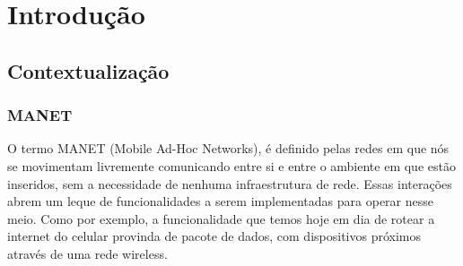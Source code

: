 \documentclass[12pt, %
openright, 
oneside,
a4paper,
brazil]{facom-ufu-abntex2}
\begin{document}


\tableofcontents*
\cleardoublepage





\textual



\chapter{Introdução}
\section{Contextualização}
\subsection{MANET}
O termo MANET (Mobile Ad-Hoc Networks), é definido pelas redes em que nós se movimentam livremente comunicando entre si e entre o ambiente em que estão inseridos, sem a necessidade de nenhuma infraestrutura de rede. Essas interações abrem um leque de funcionalidades a serem implementadas para operar nesse meio. Como por exemplo, a funcionalidade que temos hoje em dia de rotear a internet do celular provinda de pacote de dados, com dispositivos próximos através de uma rede wireless.
\end{document}
